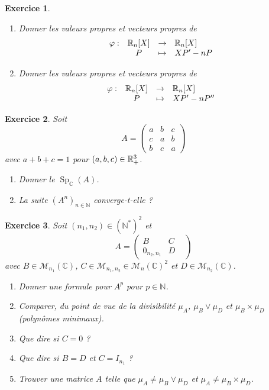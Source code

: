 \documentclass[12pt]{article}
\newtheorem{exercise}{Exercice}[section]
\theoremstyle{remark}
\theoremstyle{remark}
\newcommand{\C}{\mathbb{C}} \newcommand{\Q}{\mathbb{Q}}
\newcommand{\N}{\mathbb{N}} \newcommand{\Z}{\mathbb{Z}}
\newcommand{\M}{\mathcal{M}} \renewcommand{\L}{\mathcal{L}}
\DeclareMathOperator{\Sp}{Sp} \DeclareMathOperator{\mat}{mat}
\newcommand{\function}[5]{
	$$
	\begin{array}{rccl}
		#1: & #2 & \to & #3 \\
		& #4 & \mapsto & #5
	\end{array}
	$$
}
\begin{document}
\begin{exercise}
	\phantom{}
	\begin{enumerate}
		\item Donner les valeurs propres et vecteurs propres de \function{\varphi}{\R_n[X]}{\R_n[X]}{P}{XP'-nP}
		\item Donner les valeurs propres et vecteurs propres de \function{\varphi}{\R_n[X]}{\R_n[X]}{P}{XP'-nP''}
	\end{enumerate}
\end{exercise}

\begin{exercise}
	Soit 
	$$
	A=
	\begin{pmatrix}
		a & b & c\\
		c & a & b\\
		b & c & a
	\end{pmatrix}
	$$
	avec $a+b+c=1$ pour $(a,b,c)\in\mathbb{R}_{+}^{3}$.
	\begin{enumerate}
		\item Donner le $\Sp_{\C}(A)$.
		\item La suite $(A^{n})_{n\in\N}$ converge-t-elle ?
	\end{enumerate}
\end{exercise}

\begin{exercise}
	Soit $(n_{1},n_{2})\in(\N^{*})^{2}$ et
	$$
	A=
	\begin{pmatrix}
		B & C &\\
		0_{n_{2},n_{1}} & D
	\end{pmatrix}
	$$
	avec $B\in\M_{n_{1}}(\C)$, $C\in\M_{n_{1},n_{2}}\in\M_{n}(\C)^{2}$ et $D\in\M_{n_{2}}(\C)$.
	\begin{enumerate}
		\item Donner une formule pour $A^{p}$ pour $p\in\N$.
		\item Comparer, du point de vue de la divisibilité $\mu_{A}$, $\mu_{B}\vee\mu_{D}$ et $\mu_{B}\times\mu_{D}$ (polynômes minimaux).
		\item Que dire si $C=0$ ?
		\item Que dire si $B=D$ et $C=I_{n_{1}}$ ?
		\item Trouver une matrice $A$ telle que $\mu_{A}\neq \mu_{B}\vee\mu_{D}$ et $\mu_{A}\neq \mu_{B}\times\mu_{D}$.
	\end{enumerate}
\end{exercise}
\end{document}
